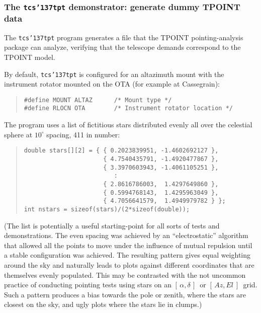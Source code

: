 \documentclass[12pt,fleqn,twoside]{article}
\renewcommand{\_}{{\tt\char'137}}     %
\newcommand{\radec}     {$[\,\alpha,\delta\,]$}
\newcommand{\azel}      {$[\,Az,El~]$}
\begin{document}
\newpage
\subsubsection{The {\tt tcs\_tpt} demonstrator: generate dummy TPOINT data}
\label{tcs_tpt}

The {\tt tcs\_tpt} program generates a file that the TPOINT
pointing-analysis package can analyze, verifying that the telescope
demands correspond to the TPOINT model.

By default, {\tt tcs\_tpt} is configured for an altazimuth mount
with the instrument rotator mounted on the OTA (for example
at Cassegrain):
\begin{quote}
\begin{small}
\begin{verbatim}
#define MOUNT ALTAZ      /* Mount type */
#define RLOCN OTA        /* Instrument rotator location */
\end{verbatim}\end{small}
\end{quote}
The program uses a list of
fictitious stars distributed evenly all over the celestial
sphere at $10^\circ$ spacing, 411 in number:
\begin{quote}
\begin{small}
\begin{verbatim}
double stars[][2] = { { 0.2023839951, -1.4602692127 },
                      { 4.7540435791, -1.4920477867 },
                      { 3.3970603943, -1.4061105251 },
                         :
                      { 2.8616786003,  1.4297649860 },
                      { 0.5994768143,  1.4295963049 },
                      { 4.7056641579,  1.4949979782 } };
int nstars = sizeof(stars)/(2*sizeof(double));
\end{verbatim}\end{small}
\end{quote}
(The list is potentially a useful starting-point for all sorts of tests and
demonstrations.  The even spacing was achieved by an ``electrostatic''
algorithm that allowed all the points to move under the influence of
mutual repulsion until a stable configuration was achieved.  The resulting
pattern gives equal weighting around the sky and naturally
leads to plots against different coordinates that are themselves
evenly populated.  This may be contrasted with the not
uncommon practice of conducting pointing tests using stars on an
\radec\ or \azel\ grid.  Such a pattern produces a bias towards the
pole or zenith, where the stars are closest on the sky, and ugly plots
where the stars lie in clumps.)
\end{document}
